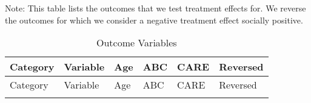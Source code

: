 \begin{center}
\begin{ThreePartTable}

\begin{TableNotes}
Note: This table lists the outcomes that we test treatment effects for. We reverse the outcomes for which we consider a negative treatment effect socially positive.
\end{TableNotes}


\begin{longtable}{L{4cm} L{5cm} C{1cm} C{1cm} C{1.2cm} C{1.5cm}}

\caption{Outcome Variables} \\

\toprule
Category	&	Variable	&	Age	&	ABC	&	CARE	&	Reversed	\\ \midrule
\endfirsthead

\toprule
Category	&	Variable	&	Age	&	ABC	&	CARE	&	Reversed	\\ \midrule
\endhead

\midrule
\endfoot

\endlastfoot


\end{longtable}
\end{ThreePartTable}
\end{center}
